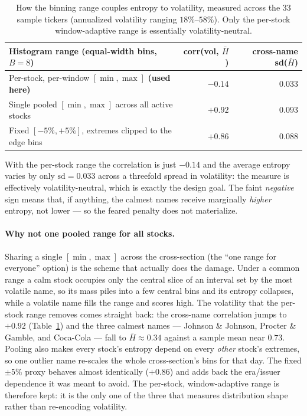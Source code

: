 \documentclass[a4paper,12pt]{article}
\begin{document}
\begin{table}[H]
\centering
\small
\begin{tabular}{lrr}
\toprule
Histogram range (equal-width bins, $B=8$) & corr(vol, $\bar H$) & cross-name sd($\bar H$)\\
\midrule
Per-stock, per-window $[\min,\max]$ \textbf{(used here)} & $-0.14$ & $0.033$\\
Single pooled $[\min,\max]$ across all active stocks & $+0.92$ & $0.093$\\
Fixed $[-5\%,+5\%]$, extremes clipped to the edge bins & $+0.86$ & $0.088$\\
\bottomrule
\end{tabular}
\caption{How the binning range couples entropy to volatility, measured across the 33 sample tickers (annualized volatility ranging $18\%$--$58\%$). Only the per-stock window-adaptive range is essentially volatility-neutral.}
\label{tab:binning}
\end{table}

With the per-stock range the correlation is just $-0.14$ and the average entropy varies by only $\mathrm{sd}=0.033$ across a threefold spread in volatility: the measure is effectively volatility-neutral, which is exactly the design goal. The faint \emph{negative} sign means that, if anything, the calmest names receive marginally \emph{higher} entropy, not lower --- so the feared penalty does not materialize.

\paragraph{Why not one pooled range for all stocks.} Sharing a single $[\min,\max]$ across the cross-section (the ``one range for everyone'' option) is the scheme that actually does the damage. Under a common range a calm stock occupies only the central slice of an interval set by the most volatile name, so its mass piles into a few central bins and its entropy collapses, while a volatile name fills the range and scores high. The volatility that the per-stock range removes comes straight back: the cross-name correlation jumps to $+0.92$ (Table~\ref{tab:binning}) and the three calmest names --- Johnson \& Johnson, Procter \& Gamble, and Coca-Cola --- fall to $\bar H\approx0.34$ against a sample mean near $0.73$. Pooling also makes every stock's entropy depend on every \emph{other} stock's extremes, so one outlier name re-scales the whole cross-section's bins for that day. The fixed $\pm5\%$ proxy behaves almost identically ($+0.86$) and adds back the era/issuer dependence it was meant to avoid. The per-stock, window-adaptive range is therefore kept: it is the only one of the three that measures distribution shape rather than re-encoding volatility.
\end{document}
